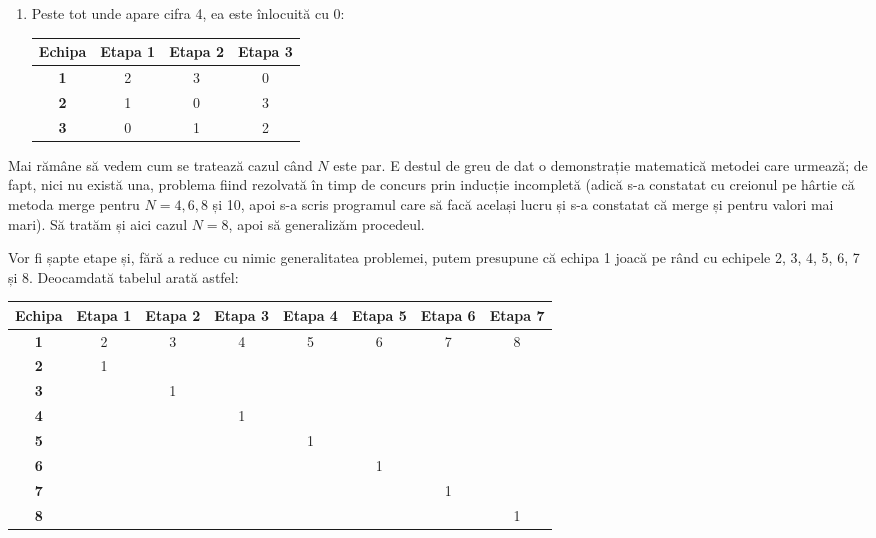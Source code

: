 \begin{enumerate}[label=(\alph*)]
\item Peste tot unde apare cifra 4, ea este înlocuită cu 0:

  \begin{table}[H]
    \centering
    \begin{tabular}{c|ccc}
      \hline
          {\bf Echipa} & {\bf Etapa 1} & {\bf Etapa 2} & {\bf Etapa 3}\\ \hline
          {\bf 1}      & 2             & 3             & 0 \\
          {\bf 2}      & 1             & 0             & 3 \\
          {\bf 3}      & 0             & 1             & 2 \\
          \hline
    \end{tabular}
  \end{table}

\end{enumerate}

Mai rămâne să vedem cum se tratează cazul când $N$ este par. E destul de greu
de dat o demonstrație matematică metodei care urmează; de fapt, nici nu există
una, problema fiind rezolvată în timp de concurs prin inducție incompletă
(adică s-a constatat cu creionul pe hârtie că metoda merge pentru $N = 4, 6,
8$ și 10, apoi s-a scris programul care să facă același lucru și s-a constatat
că merge și pentru valori mai mari). Să tratăm și aici cazul $N = 8$, apoi să
generalizăm procedeul.

Vor fi șapte etape și, fără a reduce cu nimic generalitatea problemei, putem
presupune că echipa 1 joacă pe rând cu echipele 2, 3, 4, 5, 6, 7 și
8. Deocamdată tabelul arată astfel:

\begin{table}[H]
  \setlength{\tabcolsep}{5pt}
  \centering
  \begin{tabular}{c|ccccccc}
    \hline
        {\bf Echipa} & {\bf Etapa 1} & {\bf Etapa 2} & {\bf Etapa 3} &
        {\bf Etapa 4} & {\bf Etapa 5} & {\bf Etapa 6} & {\bf Etapa 7} \\ \hline
        {\bf 1} & 2 & 3 & 4 & 5 & 6 & 7 & 8 \\
        {\bf 2} & 1 &   &   &   &   &   &   \\
        {\bf 3} &   & 1 &   &   &   &   &   \\
        {\bf 4} &   &   & 1 &   &   &   &   \\
        {\bf 5} &   &   &   & 1 &   &   &   \\
        {\bf 6} &   &   &   &   & 1 &   &   \\
        {\bf 7} &   &   &   &   &   & 1 &   \\
        {\bf 8} &   &   &   &   &   &   & 1 \\
        \hline
  \end{tabular}
\end{table}


